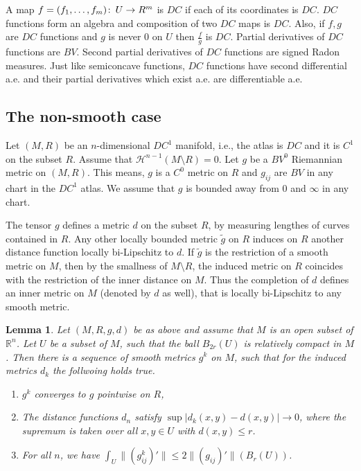 \documentclass[12pt,leqno]{amsart}
\numberwithin{equation}{section}
\newtheorem{lem}[thm]{Lemma}
\theoremstyle{definition}
\theoremstyle{remark}
\newcommand{\R}{\mathbb{R}}
\def\co{\colon\thinspace}
\begin{document}
A map $f=(f_1,\ldots, f_m)\co U\to R^m$ is $DC$ if each of its coordinates is $DC$.
 $DC$ functions form an algebra and composition of two $DC$ maps is $DC$. Also, if $f,g$ are $DC$ functions and $g$ is never $0$ on $U$ then $\frac f g$ is $DC$.
Partial derivatives of $DC$ functions are $BV$. Second partial derivatives of $DC$ functions are signed Radon measures. Just like semiconcave functions, $DC$ functions have second differential  a.e. and their partial derivatives which exist a.e. are differentiable a.e.



\subsection{The non-smooth case}
Let $(M,R)$ be an $n$-dimensional  $DC^1$ manifold, i.e., the atlas is $DC$ and it is
$C^1$ on the subset $R$.  Assume that $\mathcal H^{n-1} (M\setminus R) =0$.  Let $g$ be a $BV^0$
Riemannian metric on $(M,R)$. This means, $g$ is a $C^0$ metric on $R$ and $g_{ij}$ are $BV$ in any chart in the $DC^1$ atlas.  We assume that $g$ is bounded  away from $0$ and $\infty$ in any chart.

 The tensor $g$ defines a metric $d$ on the subset $R$, by measuring lengthes of curves contained in $R$.
Any other locally bounded metric $\tilde g$ on $R$ induces on $R$ another distance function locally bi-Lipschitz to $d$.
  If $\tilde g$ is the restriction of a smooth metric on $M$, then by the smallness of $M\setminus R$,
  the induced metric on $R$ coincides with the restriction of the inner distance on $M$.
   Thus  the completion of $d$   defines an inner  metric on $M$
  (denoted by $d$ as well), that is locally bi-Lipschitz to any smooth metric.



 \begin{lem}
 Let $(M,R,g,d)$ be as above and assume that $M$ is an open subset of $\R^n$. Let $U$ be a subset
 of $M$, such that the ball $B_{2r} (U)$ is relatively compact in $M$. Then
 there is a sequence of smooth metrics $g^k$ on $M$, such that for the induced metrics $d_k$ the follwoing holds true.

 \begin{enumerate}
 \item $g^k$ converges to $g$ pointwise on $R$,
 \item  The distance functions $d_n$ satisfy $\sup |d_k (x,y)- d(x,y)| \to 0$, where the supremum is taken
 over all $x,y \in U$ with $ d(x,y) \leq r$.
 \item For all $n$, we have $\int _U  \|(g^k_{ij} )'\| \leq 2\|(g _{ij})'\|(  B_r (U))$.
 \end{enumerate}
\end{lem}
\end{document}
